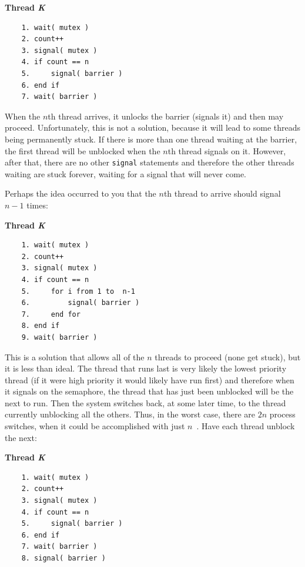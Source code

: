 \textbf{Thread \textit{K}}\vspace{-2em}
  \begin{verbatim}
	1. wait( mutex )
	2. count++
	3. signal( mutex )
	4. if count == n
	5.     signal( barrier )
	6. end if
	7. wait( barrier )
  \end{verbatim}
\vspace{-2em}

When the $n$th thread arrives, it unlocks the barrier (signals it) and then may proceed. Unfortunately, this is not a solution, because it will lead to some threads being permanently stuck. If there is more than one thread waiting at the barrier, the first thread will be unblocked when the $n$th thread signals on it. However, after that, there are no other \texttt{signal} statements and therefore the other threads waiting are stuck forever, waiting for a signal that will never come.

Perhaps the idea occurred to you that the $n$th thread to arrive should signal $n-1$ times:

\textbf{Thread \textit{K}}\vspace{-2em}
  \begin{verbatim}
	1. wait( mutex )
	2. count++
	3. signal( mutex )
	4. if count == n
	5.     for i from 1 to  n-1
	6.         signal( barrier )
	7.     end for
	8. end if
	9. wait( barrier )
  \end{verbatim}
\vspace{-2em} 

This is a solution that allows all of the $n$ threads to proceed (none get stuck), but it is less than ideal. The thread that runs last is very likely the lowest priority thread (if it were high priority it would likely have run first) and therefore when it signals on the semaphore, the thread that has just been unblocked will be the next to run. Then the system switches back, at some later time, to the thread currently unblocking all the others. Thus, in the worst case, there are $2n$ process switches, when it could be accomplished with just $n$~\cite{mte241}. Have each thread unblock the next:

\textbf{Thread \textit{K}}\vspace{-2em}
  \begin{verbatim}
	1. wait( mutex )
	2. count++
	3. signal( mutex )
	4. if count == n
	5.     signal( barrier )
	6. end if
	7. wait( barrier )
	8. signal( barrier )
  \end{verbatim}
\vspace{-2em}

